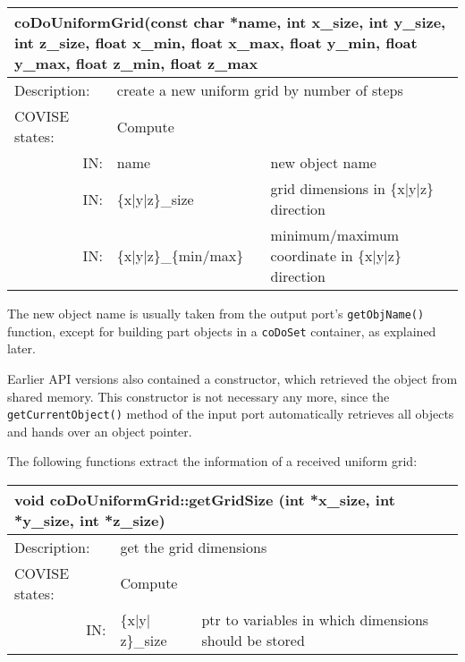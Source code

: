 \begin{htmlonly}
\begin{longtable}{|p{4cm}|p{2.5cm}|p{7cm}|}
\hline
\multicolumn{3}{|p{13.5cm}|}{\bf coDoUniformGrid(const char *name,\newline
           int     x\_size,  int     y\_size,  int     z\_size,\newline
	   float  x\_min,    float   x\_max,   float  y\_min,\newline
	   float  y\_max,    float   z\_min,   float  z\_max }\\
\hline
{Description:}  
       & \multicolumn{2}{p{9.5cm}|}{create a new uniform grid by number of steps} \\
\hline
{COVISE states:}  
           & \multicolumn{2}{p{9.5cm}|}{Compute} \\
\hline
\multicolumn{1}{|r|}{IN:} & \multicolumn{1}{p{3cm}|}{name} 
                          & \multicolumn{1}{p{5cm}|}{new object name}\\
\hline
\multicolumn{1}{|r|}{IN:} & \multicolumn{1}{p{3cm}|}{\{x|y|z\}\_size} 
                          & \multicolumn{1}{p{5cm}|}{grid dimensions\newline 
			  in \{x|y|z\} direction}\\
\hline
\multicolumn{1}{|r|}{IN:} & \multicolumn{1}{p{3cm}|}{\{x|y|z\}\_\{min/max\}} 
                          & \multicolumn{1}{p{5cm}|}{minimum/maximum coordinate 
			  in \{x|y|z\} direction}\endhead
\hline
\end{longtable}
\end{htmlonly}

The new object name is usually taken from the output port's 
{\tt getObjName()} function, except for building part objects in a {\tt coDoSet}
container, as explained later.

Earlier API versions also contained a constructor, which retrieved the object 
from shared memory. This constructor is not necessary any more, since
the {\tt getCurrentObject()} method of the input port automatically retrieves all objects 
and hands over an object pointer.

The following functions extract the information of a received uniform grid:

\latexonly
\begin{longtable}{|p{4cm}|p{2.5cm}|p{7cm}|}
\hline
\multicolumn{3}{|p{13.5cm}|}{\bf void coDoUniformGrid::getGridSize \newline
           (int *x\_size, int *y\_size, int *z\_size)}\\
\hline
{Description:}  
           & \multicolumn{2}{p{9.5cm}|}{get the grid dimensions} \\
\hline
{COVISE states:}  
           & \multicolumn{2}{p{9.5cm}|}{Compute} \\
\hline
\multicolumn{1}{|r|}{IN:} & \multicolumn{1}{p{3cm}|}{\{x$\mid$y$\mid$z\}\_size} 
                          & \multicolumn{1}{p{5cm}|}{ptr to variables in which 
			  dimensions should be stored}\endhead
\hline
\end{longtable}
\endlatexonly

